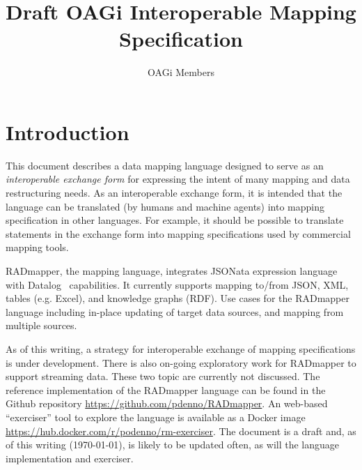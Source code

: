 \documentclass[9pt,letterpaper]{article}
\begin{document}
\title{Draft OAGi Interoperable Mapping Specification}
\author{OAGi Members}
\maketitle

\section{Introduction}
This document describes a data mapping language designed to serve as an \textit{interoperable exchange form} for expressing the intent of many mapping and data restructuring needs.
As an interoperable exchange form, it is intended that the language can be translated (by humans and machine agents) into mapping specification in other languages.
For example, it should be possible to translate statements in the exchange form into mapping specifications used by commercial mapping tools.

RADmapper, the mapping language, integrates JSONata expression language~\cite{Jsonata.org2021} with Datalog~\cite{Abiteboul1995a} capabilities. It currently supports mapping to/from JSON, XML, tables (e.g. Excel), and knowledge graphs (RDF).
Use cases for the RADmapper language including in-place updating of target data sources, and mapping from multiple sources.

As of this writing, a strategy for interoperable exchange of mapping specifications is under development. %
There is also on-going exploratory work for RADmapper to support streaming data.
These two topic are currently not discussed.
The reference implementation of the RADmapper language can be found in the Github repository \href{https://github.com/pdenno/RADmapper}{https://github.com/pdenno/RADmapper}.
An web-based ``exerciser'' tool to explore the language is available as a Docker image
\href{https://hub.docker.com/r/podenno/rm-exerciser}{https://hub.docker.com/r/podenno/rm-exerciser}.
The document is a draft and, as of this writing (\today), is likely to be updated often, as will the language implementation and exerciser.
\end{document}
